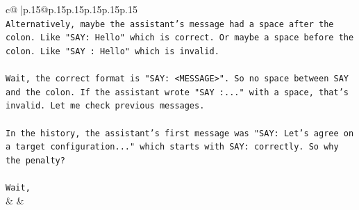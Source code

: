 \documentclass{article}
\begin{document}
{\begin{supertabular}{c@{$\;$}|p{.15\linewidth}@{}p{.15\linewidth}p{.15\linewidth}p{.15\linewidth}p{.15\linewidth}p{.15\linewidth}}
{{{\\ 
\texttt{Alternatively, maybe the assistant's message had a space after the colon. Like "SAY: Hello" which is correct. Or maybe a space before the colon. Like "SAY : Hello" which is invalid.} \\
\\ 
\texttt{Wait, the correct format is "SAY: <MESSAGE>". So no space between SAY and the colon. If the assistant wrote "SAY :..." with a space, that's invalid. Let me check previous messages.} \\
\\ 
\texttt{In the history, the assistant's first message was "SAY: Let's agree on a target configuration..." which starts with SAY: correctly. So why the penalty?} \\
\\ 
\texttt{Wait,} \\
            }
        }
    }
    & & \\ \\


\end{supertabular}}
\end{document}
